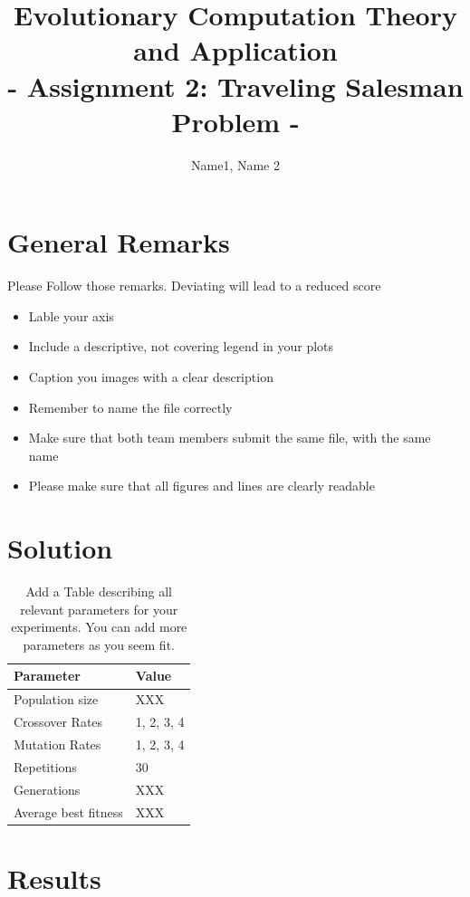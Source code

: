 \documentclass[a4paper, 12pt]{article}
\title{Evolutionary Computation Theory and Application  \\
				- Assignment 2: Traveling Salesman Problem -}
\author{Name1, Name 2}
\date{}
\begin{document}
\maketitle

\section{General Remarks }

Please Follow those remarks. Deviating will lead to a reduced score

\begin{itemize}
	\item Lable your axis 
	\item Include a descriptive, not covering legend in your plots
	\item Caption you images with a clear description
	\item Remember to name the file correctly
	\item Make sure that both team members submit the same file, with the same name
	\item Please make sure that all figures and lines are clearly readable
\end{itemize}

\section{Solution}

\begin{table} [h!]
	  \centering
\begin{tabular}{|l|l|}
\hline
\textbf{Parameter} & \textbf{Value}   \\
\hline
Population size & XXX \\
\hline
Crossover Rates &  1, 2, 3, 4 \\
\hline
Mutation Rates & 1, 2, 3, 4 \\
\hline
Repetitions & 30 \\
\hline
Generations & XXX \\
\hline
Average best fitness		 & XXX \\
\hline
\end{tabular}
\caption{Add a Table describing all relevant parameters for your experiments. You can add more parameters as you seem fit. }
\label{table:defparams}
\end{table}

\newpage
\section{Results}
\end{document}
